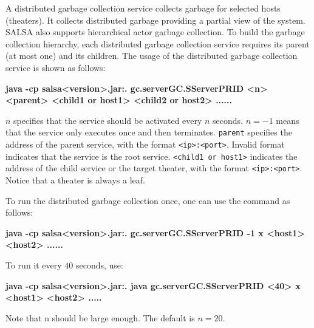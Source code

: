 A distributed garbage collection service collects garbage for selected hosts (theaters).
It collects distributed garbage providing a partial view of the system.
SALSA also supports hierarchical actor garbage collection.
To build the garbage collection hierarchy, each distributed garbage collection service
requires its parent (at most one) and its children.  
The usage of the distributed garbage collection service is shown as follows:

\textbf{java -cp salsa{\textless}version{\textgreater}.jar:. gc.serverGC.SServerPRID 
{\textless}n{\textgreater} {\textless}parent{\textgreater}
{\textless}child1 or host1{\textgreater} {\textless}child2 or host2{\textgreater} ......}

$n$ specifies that the service should be activated every $n$ seconds.
$n=-1$ means that the service only executes once and then terminates.
{\tt parent} specifies the address of the parent service, with the format 
{\tt {\textless}ip{\textgreater}:{\textless}port{\textgreater}}.
Invalid format indicates that the service is the root service.
{\tt {\textless}child1 or host1{\textgreater}} indicates
the address of the child service or the target theater, 
with the format {\tt {\textless}ip{\textgreater}:{\textless}port{\textgreater}}.
Notice that a theater is always a leaf.  

To run the distributed garbage collection once, 
one can use the command as follows:

\textbf{java -cp salsa{\textless}version{\textgreater}.jar:. gc.serverGC.SServerPRID -1 x
{\textless}host1{\textgreater} {\textless}host2{\textgreater} ......}

To run it every $40$ seconds, use:

\textbf{java -cp salsa{\textless}version{\textgreater}.jar:. java gc.serverGC.SServerPRID  
{\textless}40{\textgreater} x {\textless}host1{\textgreater} {\textless}host2{\textgreater} .....}

Note that n should be large enough. The default is $n=20$.

